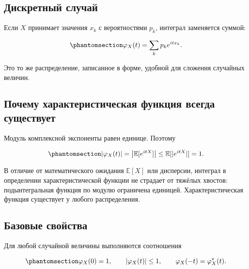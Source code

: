 \documentclass[
  russian,
  11pt,
  a4paper,
  open=any]{scrbook}
\begin{document}
\subsection{Дискретный
случай}\label{ux434ux438ux441ux43aux440ux435ux442ux43dux44bux439-ux441ux43bux443ux447ux430ux439}

Если \(X\) принимает значения \(x_k\) с вероятностями \(p_k\), интеграл
заменяется суммой:

\begin{equation}\protect\phantomsection\label{eq-characteristic-discrete}{
\varphi_X(t)=\sum_k p_k e^{itx_k}.
}\end{equation}

Это то же распределение, записанное в форме, удобной для сложения
случайных величин.

\subsection{Почему характеристическая функция всегда
существует}\label{ux43fux43eux447ux435ux43cux443-ux445ux430ux440ux430ux43aux442ux435ux440ux438ux441ux442ux438ux447ux435ux441ux43aux430ux44f-ux444ux443ux43dux43aux446ux438ux44f-ux432ux441ux435ux433ux434ux430-ux441ux443ux449ux435ux441ux442ux432ux443ux435ux442}

Модуль комплексной экспоненты равен единице. Поэтому

\begin{equation}\protect\phantomsection\label{eq-characteristic-bound}{
\left|\varphi_X(t)\right|
=\left|\mathbb E[e^{itX}]\right|
\leq \mathbb E[|e^{itX}|]
=1.
}\end{equation}

В отличие от математического ожидания \(\mathbb E[X]\) или дисперсии,
интеграл в определении характеристической функции не страдает от тяжёлых
хвостов: подынтегральная функция по модулю ограничена единицей.
Характеристическая функция существует у любого распределения.

\subsection{Базовые
свойства}\label{ux431ux430ux437ux43eux432ux44bux435-ux441ux432ux43eux439ux441ux442ux432ux430}

Для любой случайной величины выполняются соотношения

\begin{equation}\protect\phantomsection\label{eq-characteristic-basic-properties}{
\varphi_X(0)=1,
\qquad
|\varphi_X(t)|\leq1,
\qquad
\varphi_X(-t)=\varphi_X^*(t).
}\end{equation}
\end{document}
